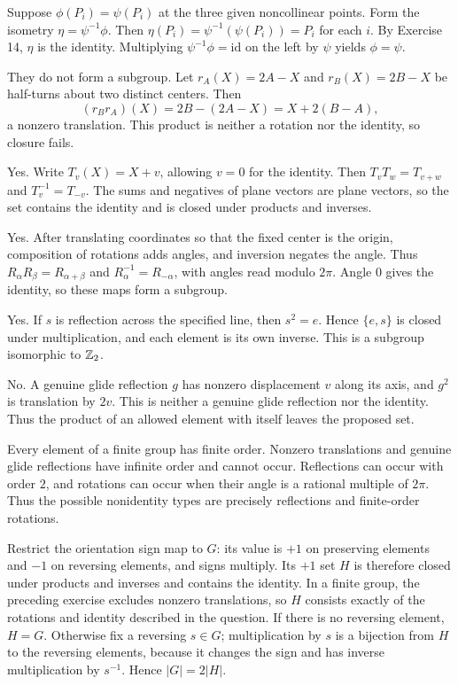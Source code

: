 Suppose $\phi(P_i)=\psi(P_i)$ at the three given noncollinear points. Form the isometry $\eta=\psi^{-1}\phi$. Then $\eta(P_i)=\psi^{-1}(\psi(P_i))=P_i$ for each $i$. By Exercise 14, $\eta$ is the identity. Multiplying $\psi^{-1}\phi=\mathrm{id}$ on the left by $\psi$ yields $\phi=\psi$.

They do not form a subgroup. Let $r_A(X)=2A-X$ and $r_B(X)=2B-X$ be half-turns about two distinct centers. Then
\[(r_Br_A)(X)=2B-(2A-X)=X+2(B-A),\]
a nonzero translation. This product is neither a rotation nor the identity, so closure fails.

Yes. Write $T_v(X)=X+v$, allowing $v=0$ for the identity. Then $T_vT_w=T_{v+w}$ and $T_v^{-1}=T_{-v}$. The sums and negatives of plane vectors are plane vectors, so the set contains the identity and is closed under products and inverses.

Yes. After translating coordinates so that the fixed center is the origin, composition of rotations adds angles, and inversion negates the angle. Thus $R_\alpha R_\beta=R_{\alpha+\beta}$ and $R_\alpha^{-1}=R_{-\alpha}$, with angles read modulo $2\pi$. Angle $0$ gives the identity, so these maps form a subgroup.

Yes. If $s$ is reflection across the specified line, then $s^2=e$. Hence $\{e,s\}$ is closed under multiplication, and each element is its own inverse. This is a subgroup isomorphic to $\mathbb{Z}_2$.

No. A genuine glide reflection $g$ has nonzero displacement $v$ along its axis, and $g^2$ is translation by $2v$. This is neither a genuine glide reflection nor the identity. Thus the product of an allowed element with itself leaves the proposed set.

Every element of a finite group has finite order. Nonzero translations and genuine glide reflections have infinite order and cannot occur. Reflections can occur with order $2$, and rotations can occur when their angle is a rational multiple of $2\pi$. Thus the possible nonidentity types are precisely reflections and finite-order rotations.

Restrict the orientation sign map to $G$: its value is $+1$ on preserving elements and $-1$ on reversing elements, and signs multiply. Its $+1$ set $H$ is therefore closed under products and inverses and contains the identity. In a finite group, the preceding exercise excludes nonzero translations, so $H$ consists exactly of the rotations and identity described in the question. If there is no reversing element, $H=G$. Otherwise fix a reversing $s\in G$; multiplication by $s$ is a bijection from $H$ to the reversing elements, because it changes the sign and has inverse multiplication by $s^{-1}$. Hence $|G|=2|H|$.


